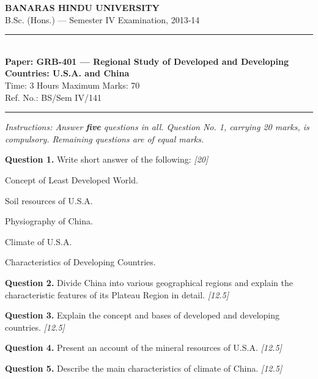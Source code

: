 \documentclass[11pt,a4paper]{article}
\newcommand{\pts}[1]{\hfill   \textit{[#1]}}
\begin{document}
\begin{center}
  {\large\bfseries BANARAS HINDU UNIVERSITY}\\[2pt]
  {\normalsize B.Sc. (Hons.) --- Semester IV Examination, 2013-14}\\[6pt]
  \rule{0.8\linewidth}{0.5pt}\\[6pt]
  {\large\bfseries Paper: GRB-401 --- Regional Study of Developed and Developing Countries: U.S.A. and China}\\[4pt]
  {\normalsize Time: 3 Hours \hfill Maximum Marks: 70}\\[2pt]
  {\small Ref. No.: BS/Sem IV/141}
\end{center}
\rule{\linewidth}{0.4pt}
\smallskip



\noindent   \textit{Instructions: Answer   \textbf{five} questions in all. Question No. 1, carrying 20 marks, is compulsory. Remaining questions are of equal marks.}
\bigskip




\noindent   \textbf{Question 1.} Write short answer of the following: \pts{20}

\begin{parts}
  \item Concept of Least Developed World.
  \item Soil resources of U.S.A.
  \item Physiography of China.
  \item Climate of U.S.A.
  \item Characteristics of Developing Countries.
\end{parts}

\medskip


\noindent   \textbf{Question 2.} Divide China into various geographical regions and explain the characteristic features of its Plateau Region in detail. \pts{12.5}

\medskip


\noindent   \textbf{Question 3.} Explain the concept and bases of developed and developing countries. \pts{12.5}

\medskip


\noindent   \textbf{Question 4.} Present an account of the mineral resources of U.S.A. \pts{12.5}

\medskip


\noindent   \textbf{Question 5.} Describe the main characteristics of climate of China. \pts{12.5}

\medskip
\end{document}
